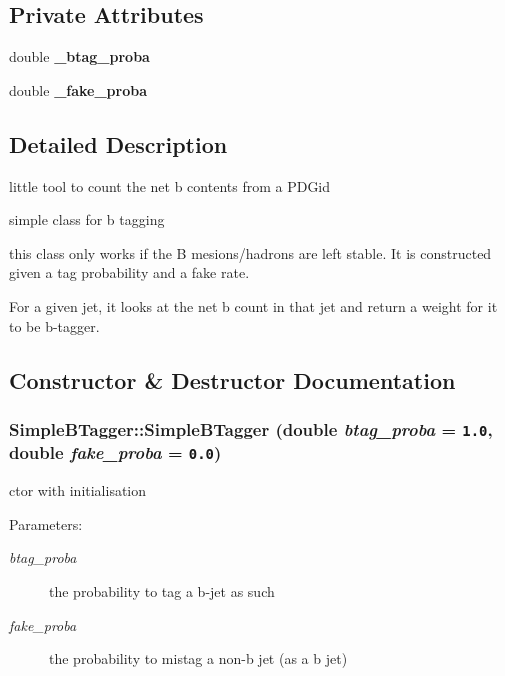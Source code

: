 \subsection*{Private Attributes}
\begin{CompactItemize}
\item 
\hypertarget{classSimpleBTagger_c53f89ce8ec2b2b48187b15f515e3963}{
double \textbf{\_\-btag\_\-proba}}
\label{classSimpleBTagger_c53f89ce8ec2b2b48187b15f515e3963}

\item 
\hypertarget{classSimpleBTagger_7a231a41dcba5eb3a67f8c5dd74e04dc}{
double \textbf{\_\-fake\_\-proba}}
\label{classSimpleBTagger_7a231a41dcba5eb3a67f8c5dd74e04dc}

\end{CompactItemize}


\subsection{Detailed Description}
little tool to count the net b contents from a PDGid 

simple class for b tagging

this class only works if the B mesions/hadrons are left stable. It is constructed given a tag probability and a fake rate.

For a given jet, it looks at the net b count in that jet and return a weight for it to be b-tagger. 



\subsection{Constructor \& Destructor Documentation}
\hypertarget{classSimpleBTagger_0c20a732020b2235c5938af0c0a5b27a}{
\subsubsection[SimpleBTagger]{\setlength{\rightskip}{0pt plus 5cm}Simple\-BTagger::Simple\-BTagger (double {\em btag\_\-proba} = {\tt 1.0}, double {\em fake\_\-proba} = {\tt 0.0})}}
\label{classSimpleBTagger_0c20a732020b2235c5938af0c0a5b27a}


ctor with initialisation \begin{Desc}
\item[Parameters:]
\begin{description}
\item[{\em btag\_\-proba}]the probability to tag a b-jet as such \item[{\em fake\_\-proba}]the probability to mistag a non-b jet (as a b jet) \end{description}
\end{Desc}


